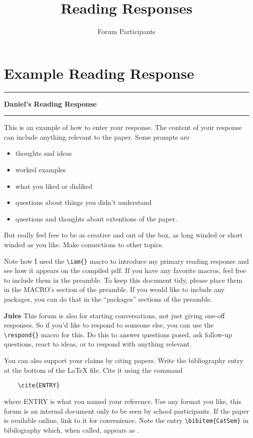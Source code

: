 \documentclass{amsart}
\author{Forum Participants}
\title{Reading Responses}
\newcommand{\iam}[1]{
  \hrule
  \vspace{0.25em}
  \textbf{{#1}'s Reading Response}
  \vspace{0.25em}
  \hrule
  \vspace{1em}
}
\newcommand{\respond}[1]{
  \vspace{1em} \textbf{#1}
}
\begin{document}
\maketitle{}


\section*{Example Reading Response}
\label{sec:ex-response}

\iam{Daniel}

This is an example of how to enter your response. The
content of your response can include anything relevant to
the paper.  Some prompts are
\begin{itemize}
\item thoughts and ideas
\item worked examples
\item what you liked or disliked
\item questions about things you didn't understand
\item questions and thoughts about extentions of the paper.
\end{itemize}
But really feel free to be as creative and out of the box,
as long winded or short winded as you like.  Make
connections to other topics.

Note how I used the \verb|\iam{}| macro to introduce my primary
reading response and see how it appears on the compiled pdf.
If you have any favorite macros, feel free to include them
in the preamble. To keep this document tidy, please place
them in the MACRO's section of the preamble.  If you would
like to include any packages, you can do that in the
``packages'' sections of the preamble.

\respond{Jules} This forum is also for starting
conversations, not just giving one-off responses.  So if
you'd like to respond to someone else, you can use the
\verb|\respond{}| macro for this. Do this to answer
questions posed, ask follow-up questions, react to ideas, or
to respond with anything relevant.

You can also support your claims by citing papers. Write
the bibliography entry at the bottom of the LaTeX file. Cite
it using the command
\begin{verbatim}
    \cite{ENTRY}
\end{verbatim}
where ENTRY is what you named your reference.  Use any
format you like, this forum is an internal document only to
be seen by school participants. If the paper is available
online, link to it for convenience. Note the entry
\verb|\bibitem{CatSem}| in bibilography which, when called,
appears as \cite{CatSem}.
\end{document}
